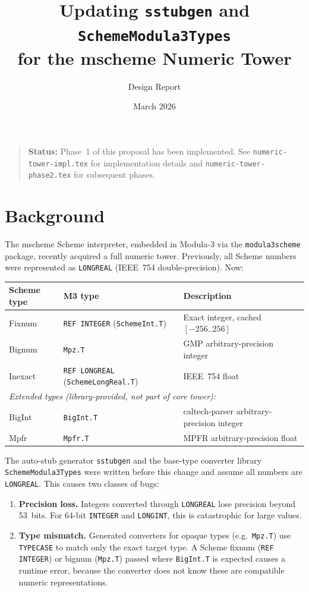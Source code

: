 \documentclass[11pt]{article}
\title{Updating \texttt{sstubgen} and \texttt{SchemeModula3Types}\\
  for the mscheme Numeric Tower}
\author{Design Report}
\date{March 2026}
\begin{document}
\maketitle

\begin{quote}
\textbf{Status:} Phase~1 of this proposal has been implemented.
See \texttt{numeric-tower-impl.tex} for implementation details
and \texttt{numeric-tower-phase2.tex} for subsequent phases.
\end{quote}

\section{Background}

The mscheme Scheme interpreter, embedded in Modula-3 via the
\texttt{modula3scheme} package, recently acquired a full numeric tower.
Previously, all Scheme numbers were represented as \texttt{LONGREAL}
(IEEE~754 double-precision).  Now:

\begin{center}
\begin{tabular}{lll}
\toprule
\textbf{Scheme type} & \textbf{M3 type} & \textbf{Description} \\
\midrule
Fixnum   & \texttt{REF INTEGER} (\texttt{SchemeInt.T}) & Exact integer, cached $[-256..256]$ \\
Bignum   & \texttt{Mpz.T}       & GMP arbitrary-precision integer \\
Inexact  & \texttt{REF LONGREAL} (\texttt{SchemeLongReal.T}) & IEEE~754 float \\
\midrule
\multicolumn{3}{l}{\emph{Extended types (library-provided, not part of core tower):}} \\
BigInt   & \texttt{BigInt.T}     & caltech-parser arbitrary-precision integer \\
Mpfr     & \texttt{Mpfr.T}      & MPFR arbitrary-precision float \\
\bottomrule
\end{tabular}
\end{center}

The auto-stub generator \texttt{sstubgen} and the base-type converter
library \texttt{SchemeModula3Types} were written before this change and
assume all numbers are \texttt{LONGREAL}.  This causes two classes of
bugs:

\begin{enumerate}
\item \textbf{Precision loss.}  Integers converted through
  \texttt{LONGREAL} lose precision beyond 53~bits.  For 64-bit
  \texttt{INTEGER} and \texttt{LONGINT}, this is catastrophic for large
  values.
\item \textbf{Type mismatch.}  Generated converters for opaque types
  (e.g.\ \texttt{Mpz.T}) use \texttt{TYPECASE} to match only the exact
  target type.  A Scheme fixnum (\texttt{REF INTEGER}) or bignum
  (\texttt{Mpz.T}) passed where \texttt{BigInt.T} is expected causes a
  runtime error, because the converter does not know these are
  compatible numeric representations.
\end{enumerate}
\end{document}
